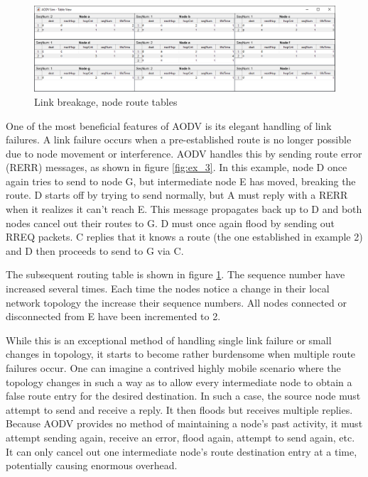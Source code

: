 \documentclass[conference]{IEEEtran}
\begin{document}
\begin{figure}[ht]
	\centering
	\includegraphics[width=6.8in]{Ex_3_table.png}
	\caption{Link breakage, node route tables}
	\label{fig:ex_3_table}
\end{figure}

One of the most beneficial features of AODV is its elegant handling of link failures. A link failure occurs when a pre-established route is no longer possible due to node movement or interference. AODV handles this by sending route error (RERR) messages, as shown in figure \ref{fig:ex_3}. In this example, node D once again tries to send to node G, but intermediate node E has moved, breaking the route. D starts off by trying to send normally, but A must reply with a RERR when it realizes it can't reach E. This message propagates back up to D and both nodes cancel out their routes to G. D must once again flood by sending out RREQ packets. C replies that it knows a route (the one established in example 2) and D then proceeds to send to G via C.

The subsequent routing table is shown in figure \ref{fig:ex_3_table}. The sequence number have increased several times. Each time the nodes notice a change in their local network topology the increase their sequence numbers. All nodes connected or disconnected from E have been incremented to 2.

While this is an exceptional method of handling single link failure or small changes in topology, it starts to become rather burdensome when multiple route failures occur. One can imagine a contrived highly mobile scenario where the topology changes in such a way as to allow every intermediate node to obtain a false route entry for the desired destination. In such a case, the source node must attempt to send and receive a reply. It then floods but receives multiple replies. Because AODV provides no method of maintaining a node's past activity, it must attempt sending again, receive an error, flood again, attempt to send again, etc. It can only cancel out one intermediate node's route destination entry at a time, potentially causing enormous overhead.
\end{document}
